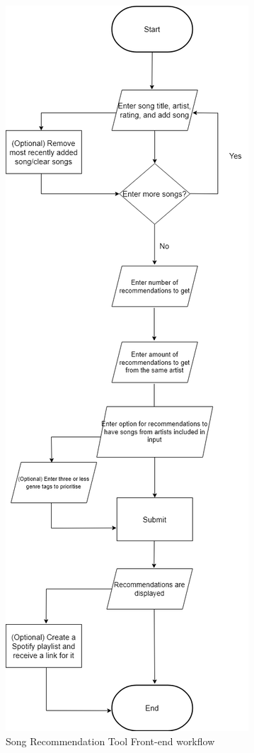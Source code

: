 \documentclass{l4proj}
\begin{document}
\begin{figure}
    \centering
    \includegraphics[width=0.6\linewidth]{images/UserWorkflow.drawio.png}
    \caption{Song Recommendation Tool Front-end workflow}
    \label{fig:frontendworkflow}
\end{figure}
\end{document}
